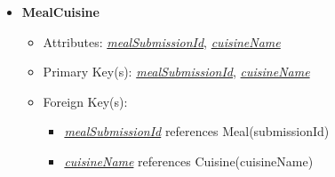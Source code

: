 \begin{itemize}
        \item \textbf{MealCuisine}
        \begin{itemize}
            \item Attributes: \underline{\textit{mealSubmissionId}}, \underline{\textit{cuisineName}}
            \item Primary Key(s): \underline{\textit{mealSubmissionId}}, \underline{\textit{cuisineName}}
            \item Foreign Key(s): 
                \begin{itemize}
                    \item \underline{\textit{mealSubmissionId}} references Meal(submissionId)
                    \item \underline{\textit{cuisineName}} references Cuisine(cuisineName)
                \end{itemize}   
        \end{itemize}
    \end{itemize}